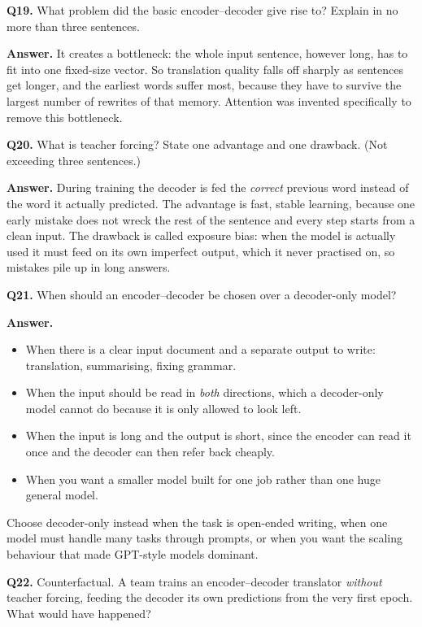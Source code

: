 \documentclass[11pt]{article}
\begin{document}
\medskip
\textbf{Q19.} What problem did the basic encoder--decoder give rise to? Explain in no more
than three sentences.

\textbf{Answer.} It creates a bottleneck: the whole input sentence, however long, has to fit
into one fixed-size vector. So translation quality falls off sharply as sentences get longer,
and the earliest words suffer most, because they have to survive the largest number of
rewrites of that memory. Attention was invented specifically to remove this bottleneck.

\medskip
\textbf{Q20.} What is teacher forcing? State one advantage and one drawback. (Not exceeding
three sentences.)

\textbf{Answer.} During training the decoder is fed the \emph{correct} previous word instead
of the word it actually predicted. The advantage is fast, stable learning, because one early
mistake does not wreck the rest of the sentence and every step starts from a clean input. The
drawback is called exposure bias: when the model is actually used it must feed on its own
imperfect output, which it never practised on, so mistakes pile up in long answers.

\medskip
\textbf{Q21.} When should an encoder--decoder be chosen over a decoder-only model?

\textbf{Answer.}
\begin{itemize}
  \item When there is a clear input document and a separate output to write: translation, summarising, fixing grammar.
  \item When the input should be read in \emph{both} directions, which a decoder-only model cannot do because it is only allowed to look left.
  \item When the input is long and the output is short, since the encoder can read it once and the decoder can then refer back cheaply.
  \item When you want a smaller model built for one job rather than one huge general model.
\end{itemize}

Choose decoder-only instead when the task is open-ended writing, when one model must handle
many tasks through prompts, or when you want the scaling behaviour that made GPT-style models
dominant.

\medskip
\textbf{Q22.} Counterfactual. A team trains an encoder--decoder translator \emph{without}
teacher forcing, feeding the decoder its own predictions from the very first epoch. What
would have happened?
\end{document}
